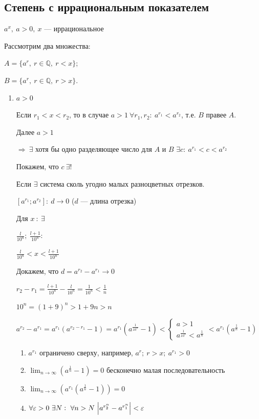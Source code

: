 \documentclass{article}
\begin{document}
    \subsection{Степень с иррациональным показателем}

    \( a^x,\ a > 0,\ x \) --- иррациональное

    Рассмотрим два множества:

    \( A = \{ a^r,\ r \in \mathbb{Q},\ r < x \} \);

    \( B = \{ a^r,\ r \in \mathbb{Q},\ r > x \} \).

    \begin{enumerate}
        \item \(a > 0\)
    
            Если \( r_1 < x < r_2 \), то в случае \( a > 1\ \forall r_1, r_2:\ a^{r_1} < a^{r_2} \), т.е. \(B\) правее \(A\).

            Далее \( a > 1 \)
            
            \(\Rightarrow\ \exists\) хотя бы одно разделяющее число для \(A\) и \(B\) \(\exists c :\ a^{r_1} < c < a^{r_2}\)

            Покажем, что \(c\ \exists !\)

            Если \(\exists\) система сколь угодно малых разноцветных отрезков. 
            
            \([a^{r_1}; a^{r_2}]:\ d \rightarrow 0\) ($d$ --- длина отрезка)
            
            Для \(x\ :\ \exists\)

            \(\frac{l}{10^n};\ \frac{l+1}{10^n}:\ \)

            \(\frac{l}{10^n} < x < \frac{l+1}{10^n}\)

            Докажем, что \(d = a^{r_2} - a^{r_1} \rightarrow 0\) 

            \( r_2 - r_1 = \frac{l + 1}{10^n} - \frac{l}{10^n} = \frac{1}{10^n} < \frac{1}{n} \)

            \( 10^n = (1 + 9)^n > 1 + 9n > n \)

            \( a^{r_2} - a^{r_1} = a^{r_1}(a^{r_2 - r_1} - 1) = a^{r_1}(a^{\frac{1}{10^n}} - 1) < \begin{cases}
                a > 1\\
                a^{\frac{1}{10^n}} < a^\frac{1}{n}
            \end{cases} < a^{r_1}(a^\frac{1}{n} - 1)\)

            \begin{enumerate}
                \item \( a^{r_1} \) ограничено сверху, например, \( a^r;\ r > x;\ a^{r_1} > 0 \)
                \item \( \lim_{n \to \infty}(a^\frac{1}{n} - 1) = 0 \) бесконечно малая последовательность
                \item \( \lim_{n \to \infty}(a^{r_1}(a^\frac{1}{n} - 1)) = 0\)
                \item \(\forall \varepsilon > 0\ \exists N:\ \forall n > N\ \abs{a^{r_2^n} - a^{r_1^n}} < \varepsilon\)
            \end{enumerate}
            

\end{enumerate}
\end{document}
